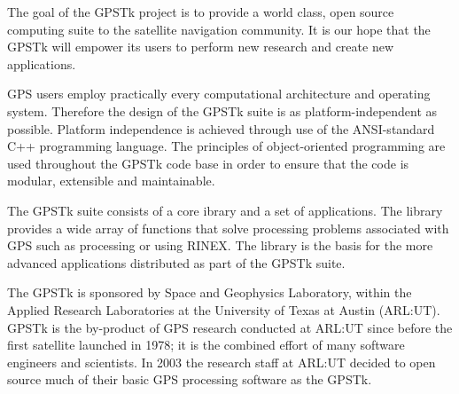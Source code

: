 \begin{titlepage}
The goal of the GPSTk project is to provide a world class, open source computing suite to the satellite navigation community. It is our hope that the GPSTk will empower its users to perform new research and create new applications.

GPS users employ practically every computational architecture and operating system. Therefore the design of the GPSTk suite is as platform-independent as possible. Platform independence is achieved through use of the ANSI-standard C++ programming language. The principles of object-oriented programming are used throughout the GPSTk code base in order to ensure that the code is modular, extensible and maintainable.

The GPSTk suite consists of a core ibrary and a set of applications. The library provides a wide array of functions that solve processing problems associated with GPS such as processing or using RINEX. The library is the basis for the more advanced applications distributed as part of the GPSTk suite.

The GPSTk is sponsored by Space and Geophysics Laboratory, within the Applied Research Laboratories at the University of Texas at Austin (ARL:UT). GPSTk is the by-product of GPS research conducted at ARL:UT since before the first satellite launched in 1978; it is the combined effort of many software engineers and scientists. In 2003 the research staff at ARL:UT decided to open source much of their basic GPS processing software as the GPSTk.
\end{titlepage}
